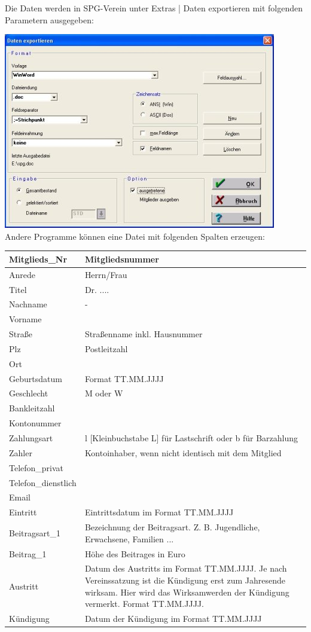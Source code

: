 \documentclass[a4paper,BCOR30mm,DIV14,pdftex,liststotoc,footsepline,openany]{scrbook}
\begin{document}
Die Daten werden in SPG-Verein unter Extras | Daten exportieren mit folgenden Parametern ausgegeben:

\includegraphics{./screenshots/spgexport.jpg}\\
Andere Programme können eine Datei mit folgenden Spalten erzeugen:\\

\begin{longtable}{|p{80pt}|p{300pt}|}
\hline
Mitglieds\_Nr&Mitgliedsnummer\\ 
\hline
Anrede & Herrn/Frau \\ 
\hline
Titel & Dr. .... \\ 
\hline
Nachname & - \\ 
\hline
Vorname&\\
\hline
Straße&Straßenname inkl. Hausnummer\\
\hline
Plz&Postleitzahl\\
\hline
Ort&\\
\hline
Geburtsdatum&Format TT.MM.JJJJ\\
\hline
Geschlecht&M oder W\\
\hline
Bankleitzahl&\\ 
\hline
Kontonummer&\\
\hline
Zahlungsart&l [Kleinbuchstabe L] für Lastschrift oder b für Barzahlung\\
\hline
Zahler&Kontoinhaber, wenn nicht identisch mit dem Mitglied\\
\hline
Telefon\_privat&\\
\hline
Telefon\_dienstlich&\\ 
\hline
Email&\\
\hline
Eintritt&Eintrittsdatum im Format TT.MM.JJJJ\\
\hline
Beitragsart\_1&Bezeichnung der Beitragsart. Z. B. Jugendliche, Erwachsene, Familien ...\\
\hline
Beitrag\_1&Höhe des Beitrages in Euro\\
\hline
Austritt&Datum des Austritts im Format TT.MM.JJJJ. Je nach Vereinssatzung ist die Kündigung erst zum Jahresende wirksam. 
Hier wird das Wirksamwerden der Kündigung vermerkt. Format TT.MM.JJJJ.\\
\hline
Kündigung&Datum der Kündigung im Format TT.MM.JJJJ\\
\hline
\end{longtable}
\end{document}
